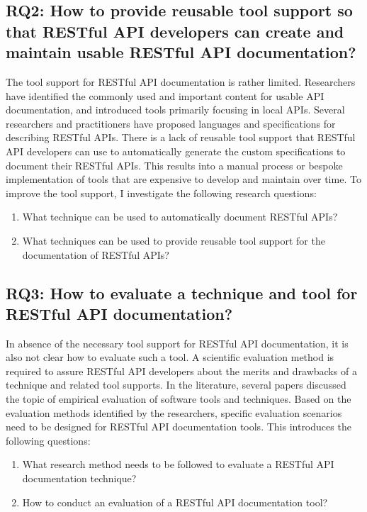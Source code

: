 \documentclass[11pt,oneside]{book}
\begin{document}
\subsection{RQ2: How to provide reusable tool support so that RESTful API developers can create and maintain usable RESTful API documentation?
} %

The tool support for RESTful API documentation is rather limited. Researchers have identified the commonly used and important content for usable API documentation, and introduced tools primarily focusing in local APIs. Several researchers and practitioners have proposed languages and specifications for describing RESTful APIs. There is a lack of reusable tool support that RESTful API developers can use to automatically generate the custom specifications to document their RESTful APIs. This results into a manual process or bespoke implementation of tools that are expensive to develop and maintain over time. To improve the tool support, I investigate the following research questions:

\begin{enumerate}
  \item What technique can be used to automatically document RESTful APIs?
  \item What techniques can be used to provide reusable tool support for the documentation of RESTful APIs?
\end{enumerate}

\subsection{RQ3: How to evaluate a technique and tool for RESTful API documentation?}

In absence of the necessary tool support for RESTful API documentation, it is also not clear how to evaluate such a tool. A scientific evaluation method is required to assure RESTful API developers about the merits and drawbacks of a technique and related tool supports. In the literature, several papers discussed the topic of empirical evaluation of software tools and techniques. Based on the evaluation methods identified by the researchers, specific evaluation scenarios need to be designed for RESTful API documentation tools. This introduces the following questions:

\begin{enumerate}
\item What research method needs to be followed to evaluate a RESTful API
documentation technique?
\item How to conduct an evaluation of a RESTful API documentation tool?
\end{enumerate}
\end{document}
